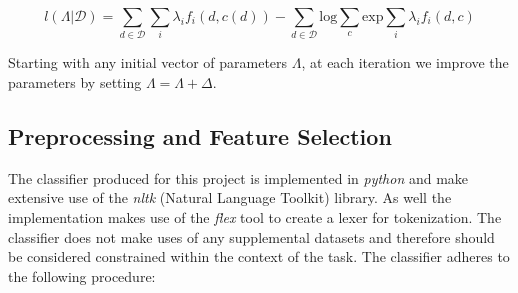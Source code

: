 \documentclass[final,3p,12pt]{elsarticle}
\begin{document}
\begin{equation}
    l(\Lambda | \mathcal{D}) = \sum\limits_{d\in\mathcal{D}} \sum\limits_{i}
    \lambda_{i} f_{i}(d,c(d)) - \sum\limits_{d\in\mathcal{D}} \mathrm{log}
    \sum\limits_{c} \mathrm{exp} \sum\limits_{i} \lambda_{i} f_{i}(d,c)
\end{equation}

Starting with any initial vector of parameters $\Lambda$, at each iteration
we improve the parameters by setting $\Lambda = \Lambda + \Delta$.


\subsection{Preprocessing and Feature Selection}
\label{ssection:featureselection}

The classifier produced for this project is implemented in \textit{python} and
make extensive use of the \textit{nltk} (Natural Language Toolkit) library. As
well the implementation makes use of the \textit{flex} tool to create a lexer
for tokenization. The classifier does not make uses of any supplemental
datasets and therefore should be considered constrained within the context of
the task. The classifier adheres to the following procedure:
\end{document}
